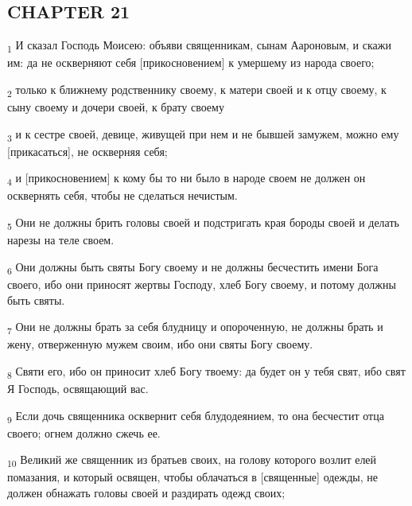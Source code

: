 \subsection{CHAPTER 21}
\begin{tcolorbox}
\textsubscript{1} И сказал Господь Моисею: объяви священникам, сынам Аароновым, и скажи им: да не оскверняют себя [прикосновением] к умершему из народа своего;
\end{tcolorbox}
\begin{tcolorbox}
\textsubscript{2} только к ближнему родственнику своему, к матери своей и к отцу своему, к сыну своему и дочери своей, к брату своему
\end{tcolorbox}
\begin{tcolorbox}
\textsubscript{3} и к сестре своей, девице, живущей при нем и не бывшей замужем, можно ему [прикасаться], не оскверняя себя;
\end{tcolorbox}
\begin{tcolorbox}
\textsubscript{4} и [прикосновением] к кому бы то ни было в народе своем не должен он осквернять себя, чтобы не сделаться нечистым.
\end{tcolorbox}
\begin{tcolorbox}
\textsubscript{5} Они не должны брить головы своей и подстригать края бороды своей и делать нарезы на теле своем.
\end{tcolorbox}
\begin{tcolorbox}
\textsubscript{6} Они должны быть святы Богу своему и не должны бесчестить имени Бога своего, ибо они приносят жертвы Господу, хлеб Богу своему, и потому должны быть святы.
\end{tcolorbox}
\begin{tcolorbox}
\textsubscript{7} Они не должны брать за себя блудницу и опороченную, не должны брать и жену, отверженную мужем своим, ибо они святы Богу своему.
\end{tcolorbox}
\begin{tcolorbox}
\textsubscript{8} Святи его, ибо он приносит хлеб Богу твоему: да будет он у тебя свят, ибо свят Я Господь, освящающий вас.
\end{tcolorbox}
\begin{tcolorbox}
\textsubscript{9} Если дочь священника осквернит себя блудодеянием, то она бесчестит отца своего; огнем должно сжечь ее.
\end{tcolorbox}
\begin{tcolorbox}
\textsubscript{10} Великий же священник из братьев своих, на голову которого возлит елей помазания, и который освящен, чтобы облачаться в [священные] одежды, не должен обнажать головы своей и раздирать одежд своих;
\end{tcolorbox}
